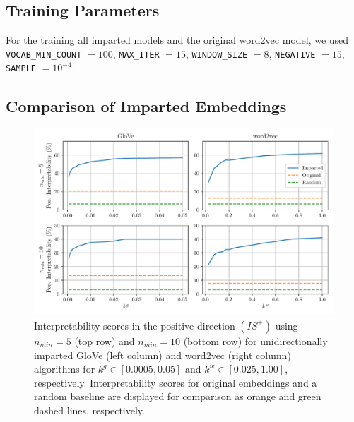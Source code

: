 \documentclass[11pt,a4paper]{article}
\begin{document}
\subsection{Training Parameters}
\label{app:training_parameters}

 For the training all imparted models and the original word2vec model, we used \verb|VOCAB_MIN_COUNT| $=100$, \verb|MAX_ITER| $=15$, \verb|WINDOW_SIZE| $=8$, \verb|NEGATIVE| $=15$, \verb|SAMPLE| $=10^{-4}$.
 
 
 
 
 
 
 
 \subsection{Comparison of Imparted Embeddings}
\label{app:impart_comparison}


\begin{figure}
	\centering
	\includegraphics[width=16cm]{Figures/interpretability_glove_vs_word2vec.pdf}
	\caption{Interpretability scores in the positive direction $(IS^+)$ using $n_{min}=5$ (top row) and $n_{min}=10$ (bottom row) for unidirectionally imparted GloVe (left column) and word2vec (right column) algorithms for $k^g \in [0.0005,0.05]$ and $k^w \in [0.025,1.00]$, respectively. Interpretability scores for original embeddings and a random baseline are displayed for comparison as orange and green dashed lines, respectively.}
	\label{fig:g_vs_w2v}
\end{figure}
\end{document}
